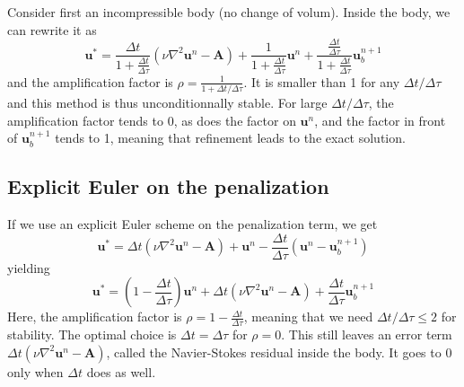 \documentclass[12pt, openany]{report}
\theoremstyle{definition}
\begin{document}
Consider first an incompressible body (no change of volum). Inside the body, we can rewrite it as 
\begin{equation}
	\boldsymbol{u}^* = \frac{\Delta t}{1+\frac{\Delta t}{\Delta \tau}}(\nu \nabla^2 \boldsymbol{u}^n-\boldsymbol{A}) + \frac{1}{1+\frac{\Delta t}{\Delta \tau}}\boldsymbol{u}^n+ \frac{\frac{\Delta t}{\Delta \tau}}{1+\frac{\Delta t}{\Delta \tau}} \boldsymbol{u}^{n+1}_b
\end{equation}
and the amplification factor is $\rho=\frac{1}{1+\Delta t/\Delta \tau}$. It is smaller than 1 for any $\Delta t/\Delta \tau$ and this method is thus unconditionnally stable. For large $\Delta t/\Delta \tau$, the amplification factor tends to 0, as does the factor on $\boldsymbol{u}^n$, and the factor in front of $\boldsymbol{u}^{n+1}_b$ tends to 1, meaning that refinement leads to the exact solution. 
\subsection{Explicit Euler on the penalization}
If we use an explicit Euler scheme on the penalization term, we get 
\begin{equation}
	\boldsymbol{u}^* = \Delta t(\nu \nabla^2 \boldsymbol{u}^n-\boldsymbol{A}) + \boldsymbol{u}^n - \frac{\Delta t}{\Delta \tau}\left(\boldsymbol{u}^n - \boldsymbol{u}^{n+1}_b\right)
\end{equation}
yielding 
\begin{equation}
	\boldsymbol{u}^* = \left(1-\frac{\Delta t}{\Delta \tau}\right) \boldsymbol{u}^n + \Delta t(\nu \nabla^2 \boldsymbol{u}^n-\boldsymbol{A}) + \frac{\Delta t}{\Delta \tau}\boldsymbol{u}^{n+1}_b
\end{equation}
Here, the amplification factor is $\rho=1-\frac{\Delta t}{\Delta \tau}$, meaning that we need $\Delta t/\Delta \tau \le 2$ for stability. The optimal choice is $\Delta t= \Delta \tau$ for $\rho=0$. This still leaves an error term $\Delta t(\nu \nabla^2 \boldsymbol{u}^n-\boldsymbol{A})$, called the Navier-Stokes residual inside the body. It goes to 0 only when $\Delta t$ does as well. 
\end{document}
